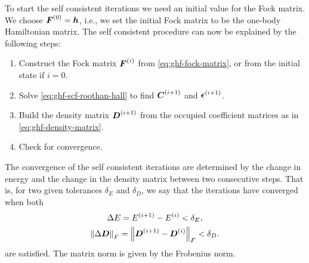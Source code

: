             To start the self consistent iterations we need an initial value for
            the Fock matrix.
            We choose $\boldsymbol{F}^{(0)} = \boldsymbol{h}$, i.e., we set the initial
            Fock matrix to be the one-body Hamiltonian matrix.
            The self consistent procedure can now be explained by the following
            steps:
            \begin{enumerate}
                \item Construct the Fock matrix $\boldsymbol{F}^{(i)}$ from
                    \autoref{eq:ghf-fock-matrix}, or from the initial state if
                    $i = 0$.
                \item Solve \autoref{eq:ghf-scf-roothan-hall} to find
                    $\boldsymbol{C}^{(i + 1)}$ and $\boldsymbol{\epsilon}^{(i + 1)}$.
                \item Build the density matrix $\boldsymbol{D}^{(i + 1)}$ from the
                    occupied coefficient matrices as in
                    \autoref{eq:ghf-density-matrix}.
                \item Check for convergence.
            \end{enumerate}
            The convergence of the self consistent iterations are determined by
            the change in energy and the change in the density matrix between
            two consecutive steps.
            That is, for two given tolerances $\delta_E$ and $\delta_D$, we say
            that the iterations have converged when both
            \begin{gather}
                \Delta E
                = E^{(i + 1)} - E^{(i)} < \delta_E,
                \\
                \norm{\Delta \boldsymbol{D}}_{F}
                = \norm{\boldsymbol{D}^{(i + 1)} - \boldsymbol{D}^{(i)}}_{F}
                < \delta_D.
            \end{gather}
            are satisfied.
            The matrix norm is given by the Frobenius norm.


